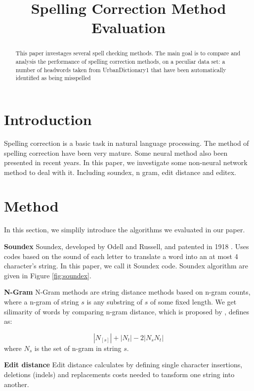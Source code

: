 \documentclass[11pt]{article}
\title{Spelling Correction Method Evaluation}
\begin{document}
\maketitle


\begin{abstract}

This paper investages several spell checking methods. The main goal is to compare and analysis the performance of spelling correction methods,  on a peculiar data set: a number of headwords taken from UrbanDictionary1 that have been automatically identified as being misspelled \cite{}

\end{abstract}

\section{Introduction}

Spelling correction is a basic task in natural language processing. The method of spelling correction have been very mature. Some neural method also been presented in recent years. In this paper, we investigate some non-neural network method to deal with it. Including soundex, n gram, edit distance and editex.


\section{Method}

In this section, we simplily introduce the algorithms we evaluated in our paper. 

\noindent\textbf{Soundex} Soundex, developed by Odell and Russell, and patented in 1918 \cite{bibid}. Uses codes based on the sound of each letter to translate a word into an at most 4 character's string. In this paper, we call it Soundex code. Soundex algorithm are given in Figure \ref{fig:soundex}.

\noindent\textbf{N-Gram} N-Gram methods are string distance methods based on n-gram counts, where a n-gram of string $s$ is any substring of $s$ of some fixed length. We get silimarity of words by comparing n-gram distance, which is proposed by \cite{_}, defines as:

\begin{equation}
|N_[s]|+|N_{t}|-2|N_{s}N_{t}|
\end{equation}
where $N_{s}$ is the set of n-gram in string $s$. 

\noindent\textbf{Edit distance} Edit distance calculates by defining single character insertions, deletions (indels) and replacements costs  needed to tansform one string into another. 
\end{document}
